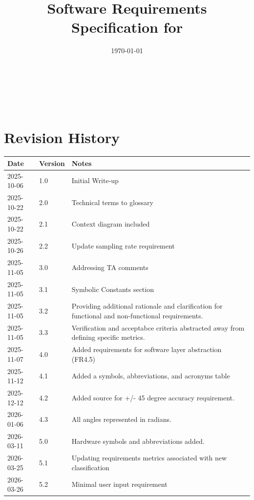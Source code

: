 \documentclass[12pt]{article}
\theoremstyle{definition}
\begin{document}
\title{Software Requirements Specification for \progname} 
\author{\authname}
\date{\today}
	
\maketitle

~\newpage


\tableofcontents
\listoffigures
\listoftables

~\newpage

\section*{Revision History}


\begin{tabularx}{\textwidth}{p{3cm}p{2cm}X} \toprule {\bf Date} & {\bf Version}
& {\bf Notes}\\
\midrule
2025-10-06 & 1.0 & Initial Write-up\\
2025-10-22 & 2.0 & Technical terms to glossary\\
2025-10-22 & 2.1 & Context diagram included\\
2025-10-26 & 2.2 & Update sampling rate requirement\\
2025-11-05 & 3.0 & Addressing TA comments\\
2025-11-05 & 3.1 & Symbolic Constants section\\
2025-11-05 & 3.2 & Providing additional rationale and clarification for
functional and non-functional requirements.\\
2025-11-05 & 3.3 & Verification and acceptabce criteria abstracted away from
defining specific metrics.\\
2025-11-07 & 4.0 & Added requirements for software layer abstraction (FR4.5) \\
2025-11-12 & 4.1 & Added a symbols, abbreviations, and acronyms table \\
2025-12-12 & 4.2 & Added source for +/- 45 degree accuracy requirement.\\
2026-01-06 & 4.3 & All angles represented in radians.\\
2026-03-11 & 5.0 & Hardware symbols and abbreviations added.\\
2026-03-25 & 5.1 & Updating requirements metrics associated with new 
classification\\
2026-03-26 & 5.2 & Minimal user input requirement \\
\bottomrule
\end{tabularx}
\end{document}
